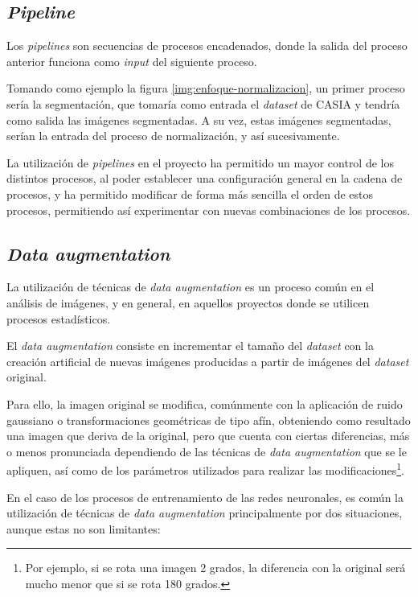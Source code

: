 \subsection{\textit{Pipeline}}

Los \textit{pipelines} son secuencias de procesos encadenados, donde la salida del proceso anterior funciona como \textit{input} del siguiente proceso.

Tomando como ejemplo la figura \ref{img:enfoque-normalizacion}, un primer proceso sería la segmentación, que tomaría como entrada el \textit{dataset} de CASIA y tendría como salida 
las imágenes segmentadas. A su vez, estas imágenes segmentadas, serían la entrada del proceso de normalización, y así sucesivamente.

La utilización de \textit{pipelines} en el proyecto ha permitido un mayor control de los distintos procesos, al poder establecer una configuración general en la cadena de procesos, y ha permitido modificar de forma más sencilla el orden de estos procesos, permitiendo así experimentar con nuevas combinaciones de los procesos.

\subsection{\textit{Data augmentation}}\label{dataaugmentation}

La utilización de técnicas de \textit{data augmentation} es un proceso común en el análisis de imágenes, y en general, en aquellos proyectos donde se utilicen procesos estadísticos. 

El \textit{data augmentation} consiste en incrementar el tamaño del \textit{dataset} con la creación artificial de nuevas imágenes producidas a partir de imágenes del \textit{dataset} original.

Para ello, la imagen original se modifica, comúnmente con la aplicación de ruido gaussiano o transformaciones geométricas de tipo afín, obteniendo como resultado una imagen que deriva de la original, pero que cuenta con ciertas diferencias, más o menos pronunciada dependiendo de las técnicas 
de \textit{data augmentation} que se le apliquen, así como de los parámetros utilizados para realizar las modificaciones\footnote{Por ejemplo, si se rota una imagen 2 grados, la diferencia con la original será mucho menor que si se rota 180 grados.}.	

En el caso de los procesos de entrenamiento de las redes neuronales, es común la utilización de técnicas de \textit{data augmentation} principalmente por dos situaciones, aunque estas no son limitantes:


